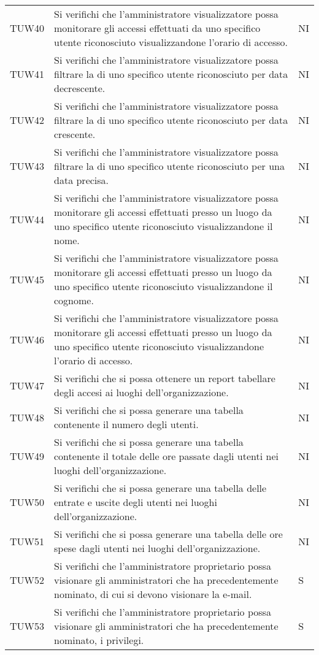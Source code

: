 {\begin{longtable}{ c C{13cm} C{1cm}}
TUW40 & Si verifichi che l’amministratore visualizzatore possa monitorare gli accessi effettuati da uno specifico utente riconosciuto visualizzandone l’orario di accesso. & NI \\
TUW41 & Si verifichi che l’amministratore visualizzatore possa filtrare la  di uno specifico utente riconosciuto per data decrescente. & NI \\
TUW42 & Si verifichi che l’amministratore visualizzatore possa filtrare la  di uno specifico utente riconosciuto per data crescente. & NI \\
TUW43 & Si verifichi che l’amministratore visualizzatore possa filtrare la  di uno specifico utente riconosciuto per una data precisa. & NI \\
TUW44 & Si verifichi che l’amministratore visualizzatore possa monitorare gli accessi effettuati presso un luogo da uno specifico utente riconosciuto visualizzandone il nome. & NI \\
TUW45 & Si verifichi che l’amministratore visualizzatore possa monitorare gli accessi effettuati presso un luogo da uno specifico utente riconosciuto visualizzandone il cognome. & NI \\
TUW46 & Si verifichi che l’amministratore visualizzatore possa monitorare gli accessi effettuati presso un luogo da uno specifico utente riconosciuto visualizzandone l’orario di accesso. & NI \\
TUW47 & Si verifichi che si possa ottenere un report tabellare degli accesi ai luoghi dell'organizzazione. & NI \\
TUW48 & Si verifichi che si possa generare una tabella contenente il numero degli utenti. & NI \\
TUW49 & Si verifichi che si possa generare una tabella contenente il totale delle ore passate dagli utenti nei luoghi dell’organizzazione. & NI \\
TUW50 & Si verifichi che si possa generare una tabella delle entrate e uscite degli utenti nei luoghi dell'organizzazione. & NI \\
TUW51 & Si verifichi che si possa generare una tabella delle ore spese dagli utenti nei luoghi dell'organizzazione. & NI \\
TUW52 & Si verifichi che l’amministratore proprietario possa visionare gli amministratori che ha precedentemente nominato, di cui si devono visionare la e-mail. & S \\
TUW53 & Si verifichi che l’amministratore proprietario possa visionare gli amministratori che ha precedentemente nominato, i privilegi. & S \\

\end{longtable}}
